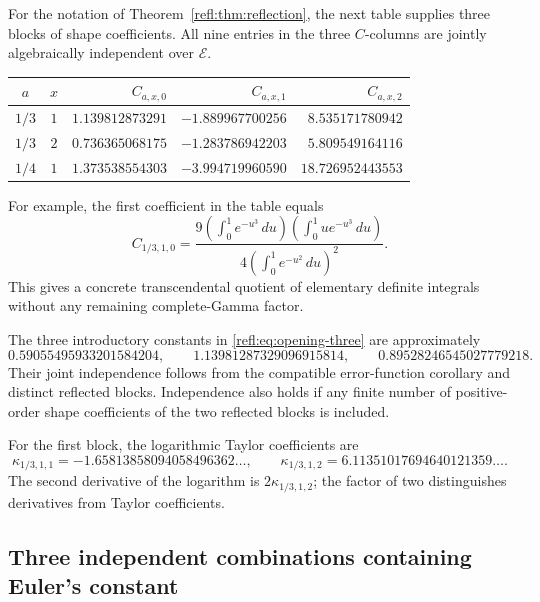 \documentclass[11pt,a4paper]{article}
\newcommand{\E}{\mathcal E}
\theoremstyle{definition}
\theoremstyle{remark}
\numberwithin{equation}{section}
\begin{document}
For the notation of Theorem~\ref{refl:thm:reflection}, the next table supplies
three blocks of shape coefficients. All nine entries in the three
$C$-columns are jointly algebraically independent over $\E$.
\begin{center}
\begin{tabular}{@{}ccrrr@{}}
\toprule
$a$ & $x$ & $C_{a,x,0}$ & $C_{a,x,1}$ & $C_{a,x,2}$\\
\midrule
$1/3$ & $1$ & $1.139812873291$ & $-1.889967700256$ & $8.535171780942$\\
$1/3$ & $2$ & $0.736365068175$ & $-1.283786942203$ & $5.809549164116$\\
$1/4$ & $1$ & $1.373538554303$ & $-3.994719960590$ & $18.726952443553$\\
\bottomrule
\end{tabular}
\end{center}
For example, the first coefficient in the table equals
\begin{equation}\label{refl:eq:cubic-quadratic-example}
 C_{1/3,1,0}
 =\frac{9\left(\int_0^1e^{-u^3}\,du\right)
            \left(\int_0^1u e^{-u^3}\,du\right)}
          {4\left(\int_0^1e^{-u^2}\,du\right)^2}.
\end{equation}
This gives a concrete transcendental quotient of elementary definite
integrals without any remaining complete-Gamma factor.

The three introductory constants in \eqref{refl:eq:opening-three} are
approximately
\[
 0.59055495933201584204,\qquad
 1.13981287329096915814,\qquad
 0.89528246545027779218.
\]
Their joint independence follows from the compatible error-function
corollary and distinct reflected blocks. Independence also holds if any finite number of positive-order shape
coefficients of the two reflected blocks is included.

For the first block, the logarithmic Taylor coefficients are
\[
 \kappa_{1/3,1,1}=-1.65813858094058496362\ldots,\qquad
 \kappa_{1/3,1,2}=6.11351017694640121359\ldots.
\]
The second derivative of the logarithm is $2\kappa_{1/3,1,2}$;
the factor of two distinguishes derivatives from Taylor coefficients.

\subsection{Three independent combinations containing Euler's constant}
\end{document}
